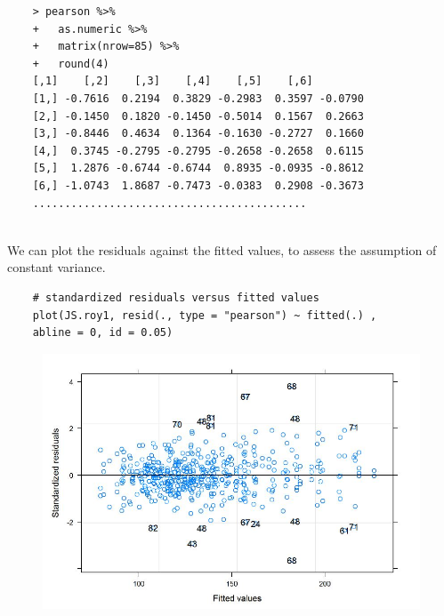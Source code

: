 \documentclass[Main.tex]{subfiles}
\begin{document}
\begin{framed}
	\begin{verbatim}
	> pearson %>%
	+   as.numeric %>% 
	+   matrix(nrow=85) %>%
	+   round(4) 
	[,1]    [,2]    [,3]    [,4]    [,5]    [,6]
	[1,] -0.7616  0.2194  0.3829 -0.2983  0.3597 -0.0790
	[2,] -0.1450  0.1820 -0.1450 -0.5014  0.1567  0.2663
	[3,] -0.8446  0.4634  0.1364 -0.1630 -0.2727  0.1660
	[4,]  0.3745 -0.2795 -0.2795 -0.2658 -0.2658  0.6115
	[5,]  1.2876 -0.6744 -0.6744  0.8935 -0.0935 -0.8612
	[6,] -1.0743  1.8687 -0.7473 -0.0383  0.2908 -0.3673
	...........................................
	
	\end{verbatim}
\end{framed}

We can plot the residuals against the fitted values, to assess the assumption of constant variance. 
\begin{framed}
	\begin{verbatim}
	# standardized residuals versus fitted values 
	plot(JS.roy1, resid(., type = "pearson") ~ fitted(.) , 
	abline = 0, id = 0.05)
	\end{verbatim}
\end{framed}
\begin{figure}[h!]
	\centering
	\includegraphics[width=0.9\linewidth]{images/Residuals-JS-Roy}
	\caption{}
	\label{fig:Residuals-JS-Roy}
\end{figure}
\end{document}
